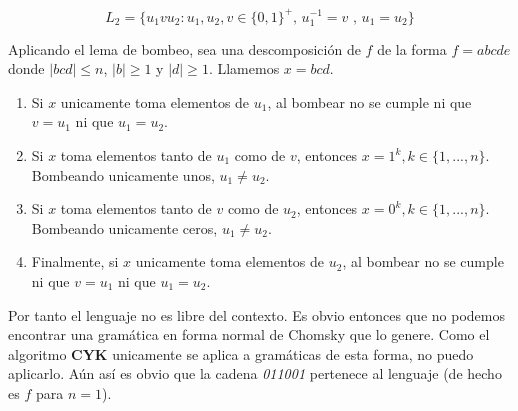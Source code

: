 \documentclass[11pt,a4paper]{article}
\begin{document}
\begin{enumerate}
		$$L_2 = \{u_1vu_2 : u_1,u_2,v \in \{0, 1\}^+ \text{, } u_1^{-1} = v \text{ , } u_1 = u_2 \} $$
	
	Aplicando el lema de bombeo, sea una descomposición de $f$ de la forma $f = abcde$ donde $|bcd| \leq n$, $|b| \geq 1$ y $|d| \geq 1$. Llamemos $x = bcd$.
	
	\begin{enumerate}
		\item Si $x$ unicamente toma elementos de $u_1$, al bombear no se cumple ni que $v = u_1$ ni que $u_1 = u_2$.
		\item Si $x$ toma elementos tanto de $u_1$ como de $v$, entonces $x = 1^k, k \in \{1, ... , n\}$. Bombeando unicamente unos, $u_1 \neq u_2$.
		\item Si $x$ toma elementos tanto de $v$ como de $u_2$, entonces $x = 0^k, k \in \{1, ... , n\}$. Bombeando unicamente ceros,
		$u_1 \neq u_2$.
		\item Finalmente, si $x$ unicamente toma elementos de $u_2$, al bombear no se cumple ni que $v = u_1$ ni que $u_1 = u_2$.
	\end{enumerate}
	
	Por tanto el lenguaje no es libre del contexto. Es obvio entonces que no podemos encontrar una gramática en forma normal de Chomsky que lo genere. Como el algoritmo \textbf{CYK} unicamente se aplica a gramáticas de esta forma, no puedo aplicarlo. Aún así es obvio que la cadena \emph{011001} pertenece al lenguaje (de hecho es $f$ para $n = 1$).	 
\end{enumerate}
\end{document}
